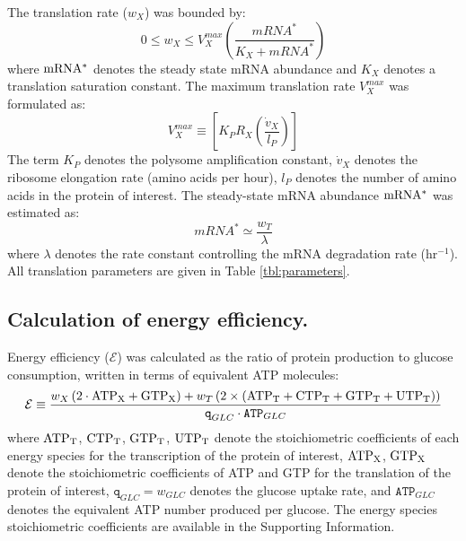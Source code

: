 \documentclass[journal=asbcd6,manuscript=article]{achemso}
\begin{document}
The translation rate ($w_{X}$) was bounded by:
 \begin{equation}
	0\leq w_{X} \leq V_{X}^{max}\left(\frac{mRNA^{*}}{K_{X}+mRNA^{*}}\right)
\end{equation}
where $\rm mRNA^{*}$ denotes the steady state mRNA abundance and $K_{X}$ denotes a translation saturation constant.
The maximum translation rate $V_{X}^{max}$ was formulated as:
\begin{equation}
	V_{X}^{max} \equiv \left[K_{P} R_{X}\left(\frac{\dot{v}_{X}}{l_{P}}\right)\right]
\end{equation}
The term $K_{P}$ denotes the polysome amplification constant,
$\dot{v}_{X}$ denotes the ribosome elongation rate (amino acids per hour),
$l_{P}$ denotes the number of amino acids in the protein of interest.
The steady-state mRNA abundance $\rm mRNA^{*}$ was estimated as:
\begin{equation}
	 mRNA^{*}\simeq\frac{w_{T}}{\lambda}
\end{equation}
where $\lambda$ denotes the rate constant controlling the mRNA degradation rate (hr$^{-1}$).
All translation parameters are given in Table \ref{tbl:parameters}.

\subsection*{Calculation of energy efficiency.}
Energy efficiency ($\mathcal{E}$) was calculated as the ratio of protein production to glucose consumption, written in terms of equivalent ATP molecules:
\begin{equation}\label{eqn:energy-efficiency-definition}
	\mathcal{E}\equiv\frac{w_{X}\left(2\cdot\rm {ATP}_{X}+\rm {GTP}_{X}\right)+w_{T}\left(2\times\left(\rm {ATP}_{T}+\rm {CTP}_{T}+\rm {GTP}_{T}+\rm {UTP}_{T}\right) \right)}{\texttt{q}_{GLC}\cdot\texttt{ATP}_{GLC}}
\end{equation}
where $\rm {ATP}_{T}$, $\rm {CTP}_{T}$, $\rm {GTP}_{T}$, $\rm {UTP}_{T}$ denote the stoichiometric coefficients of each energy species for the transcription of the protein of interest, $\rm {ATP}_{X}$, $\rm {GTP}_{X}$ denote the stoichiometric coefficients of ATP and GTP for the translation of the protein of interest, $\texttt{q}_{GLC}=w_{GLC}$ denotes the glucose uptake rate,
and $\texttt{ATP}_{GLC}$ denotes the equivalent ATP number produced per glucose.
The energy species stoichiometric coefficients are available in the Supporting Information.
\end{document}
